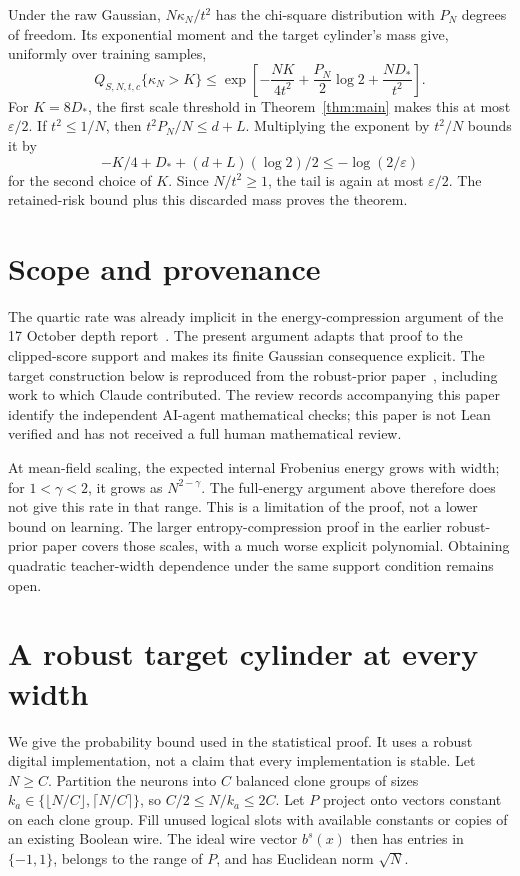 \documentclass[11pt]{article}
\begin{document}
Under the raw Gaussian, $N\kappa_N/t^2$ has the chi-square distribution
with $P_N$ degrees of freedom. Its exponential moment and the target
cylinder's mass give, uniformly over training samples,
\begin{equation}\label{eq:posterior-tail}
 Q_{S,N,t,c}\{\kappa_N>K\}
 \le\exp\!\left[-\frac{NK}{4t^2}+\frac{P_N}2\log2+
                      \frac{ND_*}{t^2}\right].
\end{equation}
For $K=8D_*$, the first scale threshold in Theorem~\ref{thm:main}
makes this at most $\varepsilon/2$.
If $t^2\le1/N$, then $t^2P_N/N\le d+L$. Multiplying the exponent by
$t^2/N$ bounds it by
\[
 -K/4+D_*+(d+L)(\log2)/2\le-\log(2/\varepsilon)
\]
for the second choice of $K$. Since $N/t^2\ge1$, the tail is again at
most $\varepsilon/2$. The retained-risk bound plus this discarded mass
proves the theorem.

\section{Scope and provenance}
The quartic rate was already implicit in the energy-compression argument
of the 17 October depth report~\cite{depth-report}. The present argument
adapts that proof to the clipped-score support and makes its finite
Gaussian consequence explicit. The target construction below is reproduced
from the robust-prior paper~\cite{robust-paper}, including work to which
Claude contributed. The review records accompanying this paper identify
the independent AI-agent mathematical checks; this paper is not Lean
verified and has not received a full human mathematical review.

At mean-field scaling, the expected internal Frobenius energy grows with
width; for $1<\gamma<2$, it grows as $N^{2-\gamma}$. The full-energy
argument above therefore does not give this rate in that range. This is
a limitation of the proof, not a lower bound on learning. The larger
entropy-compression proof in the earlier robust-prior paper covers those
scales, with a much worse explicit polynomial. Obtaining quadratic
teacher-width dependence under the same support condition remains open.

\appendix
\section{A robust target cylinder at every width}
\label{sec:theory-target-cylinder}

We give the probability bound used in the statistical proof. It uses a
robust digital implementation, not a claim that every implementation is
stable. Let $N\ge C$. Partition the neurons into $C$ balanced clone groups
of sizes $k_a\in\{\lfloor N/C\rfloor,\lceil N/C\rceil\}$, so
$C/2\le N/k_a\le2C$. Let $P$ project onto vectors constant on each clone
group. Fill unused logical slots with available constants or copies of an
existing Boolean wire. The ideal wire
vector $b^s(x)$ then has entries in $\{-1,1\}$, belongs to the range of
$P$, and has Euclidean norm $\sqrt N$.
\end{document}
